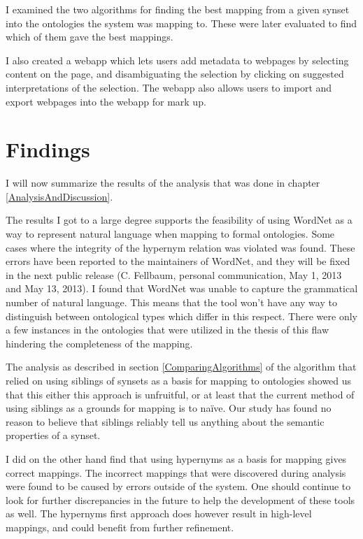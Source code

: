I examined the two algorithms for finding the best mapping from a given synset into the ontologies the system was mapping to.
These were later evaluated to find which of them gave the best mappings.

I also created a webapp which lets users add metadata to webpages by selecting content on the page,
and disambiguating the selection by clicking on suggested interpretations of the selection.
The webapp also allows users to import and export webpages into the webapp for mark up.

\section{Findings}
I will now summarize the results of the analysis that was done in chapter \ref{AnalysisAndDiscussion}.

The results I got to a large degree supports the feasibility of using WordNet as a way to represent natural language
when mapping to formal ontologies.
Some cases where the integrity of the hypernym relation was violated was found.
These errors have been reported to the maintainers of WordNet, and they will be fixed in the next public  release (C. Fellbaum, personal communication, May 1, 2013 and May 13, 2013).
I found that WordNet was unable to capture the grammatical number of natural language.
This means that the tool won't have any way to distinguish between ontological types which differ in this respect.
There were only a few instances in the ontologies that were utilized in the thesis of this flaw hindering the completeness of the mapping.

The analysis as described in section \ref{ComparingAlgorithms} of the algorithm that relied on
using siblings of synsets as a basis for mapping to ontologies showed us that this either this approach is unfruitful,
or at least that the current method of using siblings as a grounds for mapping is to naïve.
Our study has found no reason to believe that siblings reliably tell us anything about the semantic properties of a synset.

I did on the other hand find that using hypernyms as a basis for mapping gives correct mappings.
The incorrect mappings that were discovered during analysis were found to be caused by errors outside of the system.
One should continue to look for further discrepancies in the future to help the development of these tools as well.
The hypernyms first approach does however result in high-level mappings, and could benefit from further refinement.

